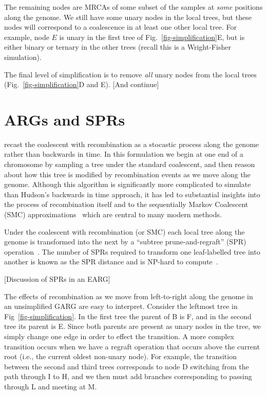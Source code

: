\documentclass{article}
\begin{document}
The remaining nodes are MRCAs of some subset of the samples
at \emph{some} positions along the genome. We still have
some unary nodes in the local trees, but these nodes will
correspond to a coalescence in at least one other
local tree. For example, node $E$ is unary in the first tree
of Fig.~\ref{fig-simplification}E, but is either binary
or ternary in the other trees (recall this is a Wright-Fisher
simulation).

The final level of simplification is to remove \emph{all}
unary nodes from the local trees (Fig.~\ref{fig-simplification}D
and E). [And continue]

\section*{ARGs and SPRs}
\citet{wiuf1999ancestry,wiuf1999recombination} recast
the coalescent with recombination
as a stocastic process along the genome rather than backwards in time.
In this formulation we begin at one end of a chromosome by
sampling a tree under the standard coalescent, and then reason
about how this tree is modified by recombination events
as we move along the genome. Although this algorithm is
significantly more complicated to simulate than Hudson's
backwards in time approach, it has led to substantial
insights into the process of recombination itself
and to the sequentially Markov Coalescent (SMC)
approximations~\citep{mcvean2005approximating,marjoram2006fast}
which are central to many modern methods.

Under the coalescent with recombination (or SMC) each local
tree along the genome is transformed into the next by
a ``subtree prune-and-regraft'' (SPR)
operation~\citep{hein1990reconstructing,song2003on,song2006properties}.
The number of SPRs required to transform one leaf-labelled tree
into another is known as the SPR distance
and is NP-hard to
compute~\citep{hein1996complexity,allen2001subtree,bordewich2005computational}.

[Discussion of SPRs in an EARG]

The effects of recombination as we move from left-to-right along
the genome in an unsimplified GARG are easy to interpret.
Consider the leftmost tree in Fig~\ref{fig-simplification}.
In the first tree the parent of B is F, and in the second
tree its parent is E. Since both parents are present as
unary nodes in the tree, we simply change one edge in
order to effect the transition.
A more complex transition occurs when we have a regraft operation
that occurs above the current root (i.e., the current oldest
non-unary node). For example, the transition between the
second and third trees corresponds to node D switching
from the path through I to H, and we then must add branches
corresponding to passing through L and meeting at M.
\end{document}
